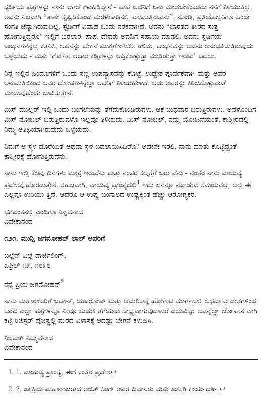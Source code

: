 ಸ್ಟರ್ಡಿಯ ಪತ್ರಗಳನ್ನು ನಾನು ಆಗಲೆ ಕಳುಹಿಸಿದ್ದೇನೆ - ಪಾಪ ಅವನಿಗೆ ಏನು ಮಾಡಬೇಕೆಂಬುದು ನನಗೆ ತಿಳಿಯುತ್ತಿಲ್ಲ. ಅವನು ನಿಜವಾಗಿ “ತಾನೇ ಸೃಷ್ಟಿಸಿಕೊಂಡ ಮರಳುಕಾಡಿನಲ್ಲಿ ವಾಸಿಸುತ್ತಿರುವನು”, ನೋಡಿ, ಪ್ರತಿಯೊಬ್ಬರಿಗೂ ಒಂದೇ ಸಂಗತಿ ಚೆನ್ನಾಗಿರುವುದಿಲ್ಲ. ಸ್ಟರ್ಡಿಗೆ ವಿವಾಹ ಒಂದು ನರಕವಾಗಿದೆ. ಅವನು “ಭಾರತದ ತೀರದ ಸುತ್ತ ಹೋಗುತ್ತಿದ್ದರೂ” ಇಲ್ಲಿಗೆ ಬರಲಾರ. ಪಾಪ, ದೇವರು ಅವನಿಗೆ ಸಹಾಯ ಮಾಡಲಿ. ಅವನು ಸ್ಟರ್ಡಿಯ ಬಂಧನಗಳನ್ನೆಲ್ಲ ಕತ್ತರಿಸಿ, ಅವನನ್ನು ಬೇಗನೆ ಮುಕ್ತಗೊಳಿಸಲಿ. ಹೌದು, ಬಂಧನವನ್ನು ಅವನು ಅನುಭವಿಸುತ್ತಿರುವುದು ಒಳ್ಳೆಯದು - ಮತ್ತು ‘ಗೋಳಿನ ಆಧಾರ ಕಡ್ಡಿಗಳನ್ನು ಅಪ್ಪಿಕೊಳ್ಳುತ್ತಾ ಮುತ್ತಿಡುತ್ತಾ ಇರುವ’ ಬದಲು.

ನಿನ್ನೆ ಇಲ್ಲಿನ ಹಿಂದೂಗಳಿಗೆ ಒಂದು ಸಣ್ಣ ಉಪನ್ಯಾಸವನ್ನು ಕೊಟ್ಟೆ. ಉದ್ದೇಶ ಪೂರ್ವಕವಾಗಿ ಮತ್ತು ಅವರ ಅನುಮತಿಯಿಂದ ಅವರ ದೋಷಗಳನ್ನೆಲ್ಲಾ ಅವರಿಗೆ ತಿಳಿಯಹೇಳಿದೆ. ಅದು ಅವರನ್ನು ಕಿರಿಚಿಕೊಳ್ಳುವಂತೆ ಮಾಡುವುದೆಂದು ಭಾವಿಸುತ್ತೇನೆ.

ಮಿಸ್ ಮುಲ್ಲರ್ ಇಲ್ಲಿ ಒಂದು ಬಂಗಲೆಯನ್ನು ತೆಗೆದುಕೊಂಡಿರುವಳು. ಆಕೆ ಬುಧವಾರ ಬರುತ್ತಿರುವಳು. ಅವಳೊಂದಿಗೆ ಮಿಸ್ ನೋಬಲ್ ಬರುತ್ತಿರುವಳೊ ಇಲ್ಲವೊ ತಿಳಿಯದು. ಮಿಸ್ ನೋಬಲ್, ನಮ್ಮ ಯೋಜನೆಯಂತೆ, ಕಾಶ್ಮೀರದಲ್ಲಿ ನಿಮ್ಮ ಅತಿಥಿಯಾಗಿರುವುದು ಒಳ್ಳೆಯದು.

ನಿಮಗೆ ಆ ಸ್ಥಳ ದೊರೆಯಿತೆ ಅಥವಾ ಸ್ಥಳ ಬದಲಾಯಿಸಿದಿರೊ? ಅದೇನೇ ಇರಲಿ, ನಾನು ಮಾತು ಕೊಟ್ಟಿದ್ದಂತೆ ಕಾಶ್ಮೀರಕ್ಕೆ ಹೋಗುತ್ತಿರುವೆನು.

ನಾನು ಇಲ್ಲಿ ಕೆಲವು ದಿನಗಳು ಮಾತ್ರ ಇರುವೆನು ಮತ್ತು ನಂತರ ಕಲ್ಕತ್ತೆಗೆ ಬರು ವೆನು - ನಂತರ ನಾನು ವಾಯವ್ಯ ಪ್ರದೇಶಕ್ಕೆ ಹೊರಡುತ್ತೇನೆ. ಸಹಜವಾಗಿ, ವಾಯವ್ಯ ಪ್ರಾಂತ್ಯದಲ್ಲಿ\footnote{1. ವಾಯವ್ಯ ಪ್ರಾಂತ್ಯ, ಈಗ ಉತ್ತರ ಪ್ರದೇಶ} ಇದು ಏನನ್ನೂ ನೋಡುವ ಸಮಯವಲ್ಲ. ಅಲ್ಲಿ ಈ ಎಲ್ಲವೂ ಉರಿಯು ತ್ತಿದೆ. ಆದರೂ ಆ ಉಷ್ಣ ಬಂಗಾಲದ ಉಷ್ಣಕ್ಕಿಂತ ಹೆಚ್ಚು ಆರೋಗ್ಯಕರ.

\begin{flushright}
ಭಗವಂತನಲ್ಲಿ ಎಂದಿಗೂ ನಿನ್ನವನಾದ\\ವಿವೇಕಾನಂದ
\end{flushright}

\begin{center}
\textbf{೧೨೧. ಮುನ್ಷಿ ಜಗಮೋಹನ್ ಲಾಲ್ ಅವರಿಗೆ}
\end{center}

\begin{flushright}
ಬಲ್ಲೆನ್ ವಿಲ್ಲೆ ಡಾರ್ಜಿಲಿಂಗ್,\\ಏಪ್ರಿಲ್ ೧೫, ೧೮೯೮
\end{flushright}

ನನ್ನ ಪ್ರಿಯ ಜಗಮೋಹನ್\footnote{2. ಖೇತ್ರಿಯ ಮಹಾರಾಜರಾದ ಅಜಿತ್ ಸಿಂಗ್ ಅವರ ದಿವಾನರು ಮತ್ತು ಖಾಸಗಿ ಕಾರ್ಯದರ್ಶಿ.}

ನಾನು ಮಹಾರಾಜರಿಗೆ ಜಪಾನ್, ಯೂರೋಪ್ ಮತ್ತು ಅಮೆರಿಕಾಕ್ಕೆ ಹೋಗುವ ಮಾರ್ಗದಲ್ಲಿ ಅಥವಾ ಆ ದೇಶಗಳಿಂದ ಬರೆದ ಎಲ್ಲಾ ಪತ್ರಗಳನ್ನೂ ನೀವೂ ಹುಡುಕಿ ತೆಗೆಯಲು ಸಾಧ್ಯವಾಗುವುದಾದರೆ ದಯವಿಟ್ಟು ಅವನ್ನೆಲ್ಲಾ ಜೋಪಾನ ವಾಗಿ ಕಟ್ಟಿ ರಿಜಿಸ್ಟರ್ ಪೋಸ್ಟ್ನಲ್ಲಿ ಮಠದ ವಿಳಾಸಕ್ಕೆ ಆದಷ್ಟು ಬೇಗನೆ ಕಳುಹಿಸಿ.

\begin{flushright}
ನಿಜವಾಗಿ ನಿಮ್ಮವನಾದ\\ವಿವೇಕಾನಂದ
\end{flushright}

